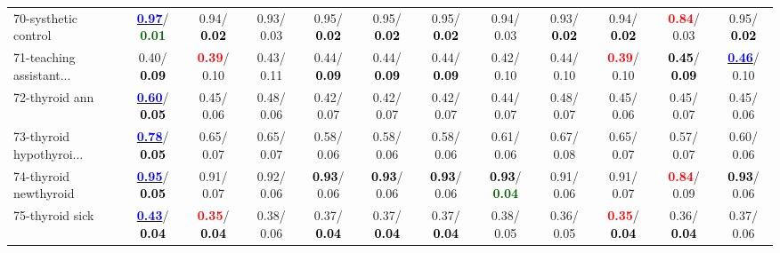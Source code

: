 \begin{table}[h]
\begin{center}
{\begin{tabular}{lc|c|c|c|c|c|c|c|c|c|c}
70-systhetic control & \underline{\textcolor{blue}{\textbf{  0.97}}}/\textcolor{darkgreen}{\textbf{  0.01}} &   0.94/\textcolor{black}{\textbf{  0.02}} &   0.93/  0.03 &   0.95/\textcolor{black}{\textbf{  0.02}} &   0.95/\textcolor{black}{\textbf{  0.02}} &   0.95/\textcolor{black}{\textbf{  0.02}} &   0.94/  0.03 &   0.93/\textcolor{black}{\textbf{  0.02}} &   0.94/\textcolor{black}{\textbf{  0.02}} & \textcolor{red}{\textbf{  0.84}}/  0.03 &   0.95/\textcolor{black}{\textbf{  0.02}} \\
71-teaching assistant... &   0.40/\textcolor{black}{\textbf{  0.09}} & \textcolor{red}{\textbf{  0.39}}/  0.10 &   0.43/  0.11 &   0.44/\textcolor{black}{\textbf{  0.09}} &   0.44/\textcolor{black}{\textbf{  0.09}} &   0.44/\textcolor{black}{\textbf{  0.09}} &   0.42/  0.10 &   0.44/  0.10 & \textcolor{red}{\textbf{  0.39}}/  0.10 & \textcolor{black}{\textbf{  0.45}}/\textcolor{black}{\textbf{  0.09}} & \underline{\textcolor{blue}{\textbf{  0.46}}}/  0.10 \\ \hline
72-thyroid ann & \underline{\textcolor{blue}{\textbf{  0.60}}}/\textcolor{black}{\textbf{  0.05}} &   0.45/  0.06 &   0.48/  0.06 &   0.42/  0.07 &   0.42/  0.07 &   0.42/  0.07 &   0.44/  0.07 &   0.48/  0.07 &   0.45/  0.06 &   0.45/  0.07 &   0.45/  0.06 \\
73-thyroid hypothyroi... & \underline{\textcolor{blue}{\textbf{  0.78}}}/\textcolor{black}{\textbf{  0.05}} &   0.65/  0.07 &   0.65/  0.07 &   0.58/  0.06 &   0.58/  0.06 &   0.58/  0.06 &   0.61/  0.06 &   0.67/  0.08 &   0.65/  0.07 &   0.57/  0.07 &   0.60/  0.06 \\
74-thyroid newthyroid & \underline{\textcolor{blue}{\textbf{  0.95}}}/\textcolor{black}{\textbf{  0.05}} &   0.91/  0.07 &   0.92/  0.06 & \textcolor{black}{\textbf{  0.93}}/  0.06 & \textcolor{black}{\textbf{  0.93}}/  0.06 & \textcolor{black}{\textbf{  0.93}}/  0.06 & \textcolor{black}{\textbf{  0.93}}/\textcolor{darkgreen}{\textbf{  0.04}} &   0.91/  0.06 &   0.91/  0.07 & \textcolor{red}{\textbf{  0.84}}/  0.09 & \textcolor{black}{\textbf{  0.93}}/  0.06 \\
75-thyroid sick & \underline{\textcolor{blue}{\textbf{  0.43}}}/\textcolor{black}{\textbf{  0.04}} & \textcolor{red}{\textbf{  0.35}}/\textcolor{black}{\textbf{  0.04}} &   0.38/  0.06 &   0.37/\textcolor{black}{\textbf{  0.04}} &   0.37/\textcolor{black}{\textbf{  0.04}} &   0.37/\textcolor{black}{\textbf{  0.04}} &   0.38/  0.05 &   0.36/  0.05 & \textcolor{red}{\textbf{  0.35}}/\textcolor{black}{\textbf{  0.04}} &   0.36/\textcolor{black}{\textbf{  0.04}} &   0.37/  0.06 \\

\end{tabular}}
\end{center}
\end{table}

